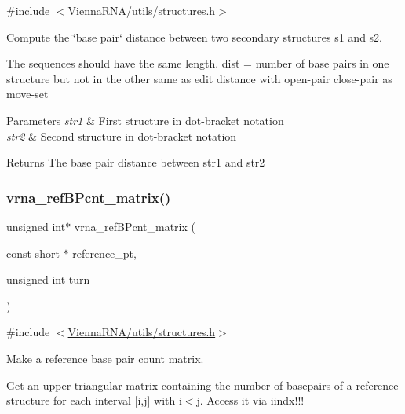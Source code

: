 {\ttfamily \#include $<$\mbox{\hyperlink{utils_2structures_8h}{Vienna\+R\+N\+A/utils/structures.\+h}}$>$}



Compute the \char`\"{}base pair\char`\"{} distance between two secondary structures s1 and s2. 

The sequences should have the same length. dist = number of base pairs in one structure but not in the other same as edit distance with open-\/pair close-\/pair as move-\/set


\begin{DoxyParams}{Parameters}
{\em str1} & First structure in dot-\/bracket notation \\
\hline
{\em str2} & Second structure in dot-\/bracket notation \\
\hline
\end{DoxyParams}
\begin{DoxyReturn}{Returns}
The base pair distance between str1 and str2 
\end{DoxyReturn}
\mbox{\label{group__struct__utils_gab4c2a00c99ce1d612ffa5bde114eb96d}} 
\subsubsection{\texorpdfstring{vrna\_refBPcnt\_matrix()}{vrna\_refBPcnt\_matrix()}}
{\footnotesize\ttfamily unsigned int$\ast$ vrna\+\_\+ref\+B\+Pcnt\+\_\+matrix (\begin{DoxyParamCaption}\item[{const short $\ast$}]{reference\+\_\+pt,  }\item[{unsigned int}]{turn }\end{DoxyParamCaption})}



{\ttfamily \#include $<$\mbox{\hyperlink{utils_2structures_8h}{Vienna\+R\+N\+A/utils/structures.\+h}}$>$}



Make a reference base pair count matrix. 

Get an upper triangular matrix containing the number of basepairs of a reference structure for each interval \mbox{[}i,j\mbox{]} with i$<$j. Access it via iindx!!! \mbox{\label{group__struct__utils_ga5a27bd058183170afd4716f5b8ff511a}} 
